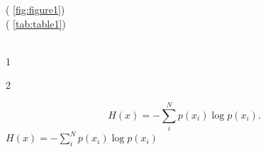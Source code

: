 \documentclass{article}
\begin{document}
    \begin{frame}{ }
          ( \ref{fig:figure1})\\
          ( \ref{tab:table1})\\
          \cite{vaswani2017attention}\\
    \end{frame}
    
    \begin{frame}{ }
        \begin{theorem}
             1 
        \end{theorem}
        \begin{definition}
             
        \end{definition}
        \begin{corollary}
             
        \end{corollary}
    \end{frame}

    \begin{frame}{ }
        \begin{theorem}
             2 
        \end{theorem}
         
        \begin{equation}
            H(x)=-\sum\limits_i^Np(x_i)\log p(x_i).
        \end{equation}
         $H(x)=-\sum\limits_i^Np(x_i)\log p(x_i)$ 
    \end{frame}

    \section{ }

    \begin{frame}[allowframebreaks]{ }
        \printbibliography[heading=none]
    \end{frame}
\end{document}
